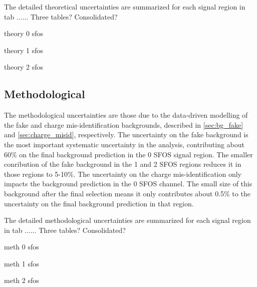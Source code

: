The detailed theoretical uncertainties are summarized for each signal 
region in tab ...... Three tables? Consolidated?
\begin{table}[ht]
\centering

\caption{theory 0 sfos}
\label{tab:sys_theory_0sfos}
\end{table}

\begin{table}[ht]
\centering

\caption{theory 1 sfos}
\label{tab:sys_theory_1sfos}
\end{table}

\begin{table}[ht]
\centering

\caption{theory 2 sfos}
\label{tab:sys_theory_2sfos}
\end{table}


\subsection{Methodological}
The methodological uncertainties are those due to the data-driven
modelling of the fake and charge mis-identification backgrounds,
described in \sec\ref{sec:bg_fake} and \sec\ref{sec:charge_misid},
respectively.
The uncertainty on the fake background is the most important
systematic uncertainty in the analysis, contributing about 60\%
on the final background prediction in the 0 SFOS signal region.
The smaller conribution of the fake background in the 1 and 2 SFOS
regions reduces it in those regions to 5-10\%.
The uncertainty on the charge mis-identification only impacts the 
background prediction in the 0 SFOS channel.  The small size
of this background after the final selection means it only contributes
about 0.5\% to the uncertainty on the final background prediction in that
region.

The detailed methodological uncertainties are summarized for each signal 
region in tab ...... Three tables? Consolidated?
\begin{table}[ht]
\centering

\caption{meth 0 sfos}
\label{tab:sys_meth_0sfos}
\end{table}

\begin{table}[ht]
\centering

\caption{meth 1 sfos}
\label{tab:sys_meth_1sfos}
\end{table}

\begin{table}[ht]
\centering

\caption{meth 2 sfos}
\label{tab:sys_meth_2sfos}
\end{table}

